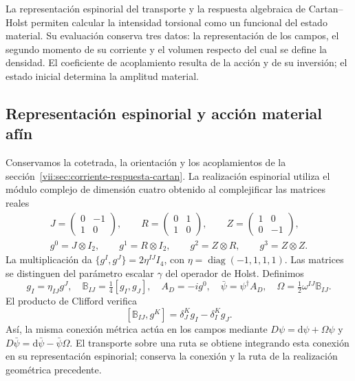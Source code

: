 La representación espinorial del transporte y la respuesta algebraica
de Cartan--Holst permiten calcular la intensidad torsional como un
funcional del estado material. Su evaluación conserva tres datos:
la representación de los campos, el segundo momento de su corriente y
el volumen respecto del cual se define la densidad. El coeficiente de
acoplamiento resulta de la acción y de su inversión; el estado inicial
determina la amplitud material.

\subsection{Representación espinorial y acción material afín}
\label{vii:subsec:accion-espinorial-afin}

Conservamos la cotetrada, la orientación y los acoplamientos de la
sección~\ref{vii:sec:corriente-respuesta-cartan}. La realización
espinorial utiliza el módulo complejo de dimensión cuatro obtenido al
complejificar las matrices reales
\begin{equation}
 \begin{gathered}
 J=\begin{pmatrix}0&-1\\1&0\end{pmatrix},\qquad
 R=\begin{pmatrix}0&1\\1&0\end{pmatrix},\qquad
 Z=\begin{pmatrix}1&0\\0&-1\end{pmatrix},\\
 g^0=J\otimes I_2,\qquad g^1=R\otimes I_2,\qquad
 g^2=Z\otimes R,\qquad g^3=Z\otimes Z.
 \end{gathered}
 \label{vii:eq:clifford-material-explicito}
\end{equation}
La multiplicación da
\(\{g^I,g^J\}=2\eta^{IJ}I_4\), con
\(\eta=\operatorname{diag}(-1,1,1,1)\). Las matrices se distinguen
del parámetro escalar \(\gamma\) del operador de Holst. Definimos
\begin{equation}
 g_I=\eta_{IJ}g^J,\quad
 \mathbb B_{IJ}=\tfrac14[g_I,g_J],\quad
 A_D=-i g^0,\quad \bar\psi=\psi^\dagger A_D,\quad
 \Omega=\tfrac12\omega^{IJ}\mathbb B_{IJ}.
 \label{vii:eq:adjunto-conexion-espinorial}
\end{equation}
El producto de Clifford verifica
\[
 [\mathbb B_{IJ},g^K]=\delta_J^K g_I-\delta_I^K g_J.
\]
Así, la misma conexión métrica actúa en los campos mediante
\(D\psi=\mathrm d\psi+\Omega\psi\) y
\(D\bar\psi=\mathrm d\bar\psi-\bar\psi\Omega\).
El transporte sobre una ruta se obtiene integrando esta conexión en
su representación espinorial; conserva la conexión y la ruta de la
realización geométrica precedente.

